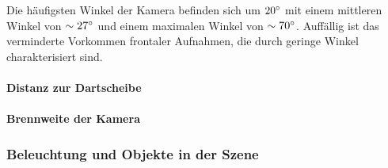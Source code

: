 Die häufigsten Winkel der Kamera befinden sich um $20^{\circ}$ mit einem mittleren Winkel von $\sim27^{\circ}$ und einem maximalen Winkel von $\sim70^{\circ}$. Auffällig ist das verminderte Vorkommen frontaler Aufnahmen, die durch geringe Winkel charakterisiert sind.

\paragraph{Distanz zur Dartscheibe}


\paragraph{Brennweite der Kamera}


\subsubsection{Beleuchtung und Objekte in der Szene}
\label{sec:beleuchtung_ergebnisse}

